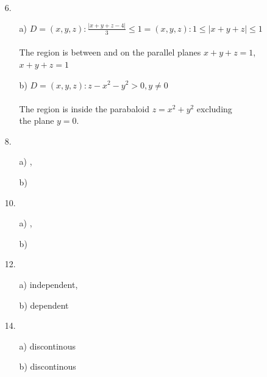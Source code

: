 \documentclass[11pt]{amsbook}
\begin{document}
\begin{enumerate}
\begin{minipage}{0.3\textwidth}
	\end{minipage}%
	\\\\
	\noindent
	\item[6.]
	\begin{enumerate}
		\item[a)]\quad $D = {(x, y, z): \frac{|x+y+z-4|}{3} \leqslant 1} = {(x, y, z): 1 \leqslant |x+y+z| \leqslant 1}$
		\\\\\indent\quad
		The region is between and on the parallel planes $x+y+z = 1$, 
		\\\indent\quad $x+y+z = 1$
		\\
		\item[b)]\quad $D = {(x, y, z): z - x^2 - y^2 > 0, y \neq 0}$
		\\\\\indent\quad
		The region is inside the parabaloid $z = x^2 + y^2$ excluding
		\\\indent\quad the plane $y = 0$.	
	\end{enumerate}
	\item[8.]
	\begin{multicols}{2}
	\begin{enumerate}
		\item[a)], \item[b)]
	\end{enumerate}
	\end{multicols}	
	\item[10.]
	\begin{multicols}{2}
	\begin{enumerate}
		\item[a)], \item[b)]
	\end{enumerate}
	\end{multicols}
	\item[12.]
	\begin{multicols}{2}
	\begin{enumerate}
	\item[a)]\quad independent, \item[b)]\quad dependent
	\end{enumerate}
	\end{multicols}
	\item[14.]
	\begin{multicols}{2}
	\begin{enumerate}
		\item[a)]\quad discontinous \item[b)]\quad discontinous
	\end{enumerate}
	\end{multicols}
	\end{enumerate}
\end{document}
